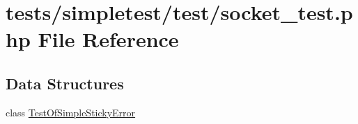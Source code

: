 \hypertarget{socket__test_8php}{\section{tests/simpletest/test/socket\-\_\-test.php File Reference}
\label{socket__test_8php}
}
\subsection*{Data Structures}
\begin{DoxyCompactItemize}
\item 
class \hyperlink{class_test_of_simple_sticky_error}{Test\-Of\-Simple\-Sticky\-Error}
\end{DoxyCompactItemize}
